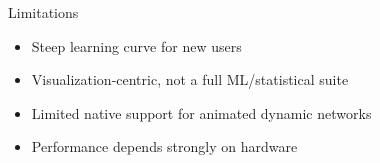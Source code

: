 \begin{frame}{Limitations}
	\begin{itemize}
		\item Steep learning curve for new users
		\item Visualization‑centric, not a full ML/statistical suite
		\item Limited native support for animated dynamic networks
		\item Performance depends strongly on hardware
	\end{itemize}
\end{frame}